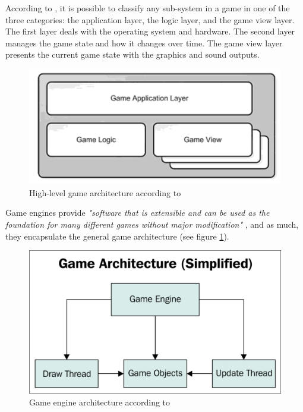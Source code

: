 \documentclass[runningheads]{llncs}
\begin{document}
According to \cite{mcshaffry_2009}, it is possible to classify any sub-system in a game in one of the three categories: the application layer, the logic layer, and the game view layer. The first layer deals with the operating system and hardware. The second layer manages the game state and how it changes over time. The game view layer presents the current game state with the graphics and sound outputs.

\begin{figure}[!h]
    \centering
    \includegraphics[scale=1.1]{src/GameArchitecture.png}
    \caption{High-level game architecture according to \cite{mcshaffry_2009}}
\end{figure}

Game engines provide \textit{"software that is extensible and can be used as the foundation for many different games without major modification"} \cite{gregory_2019}, and as much, they encapsulate the general game architecture (see figure \ref{fig:Simplified_game_engine}).

\begin{figure}[!h]
    \centering
    \includegraphics[scale=1.5]{src/hci2020-images/Game_Architecture_Raul_Portales.jpg}
    \caption{Game engine architecture according to \cite{portales}}
    \label{fig:Simplified_game_engine}
\end{figure}
\end{document}
